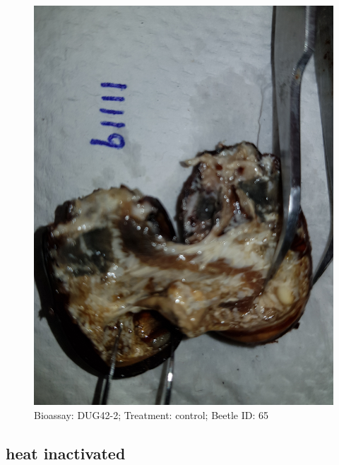 \documentclass[11pt]{scrartcl}
\begin{document}
\begin{figure}[h!]
    \centering
    \includegraphics[width=\linewidth, height=\textheight, keepaspectratio]{uploads/btl.pm_image.9c977e79c5d4ef97.44756734322031313131395f5265702d3220636f6e74726f6c2e6a7067.jpg}
    \caption{Bioassay: DUG42-2; Treatment: control; Beetle ID: 65}
\end{figure}
\clearpage

\subsection{heat inactivated}
\end{document}
